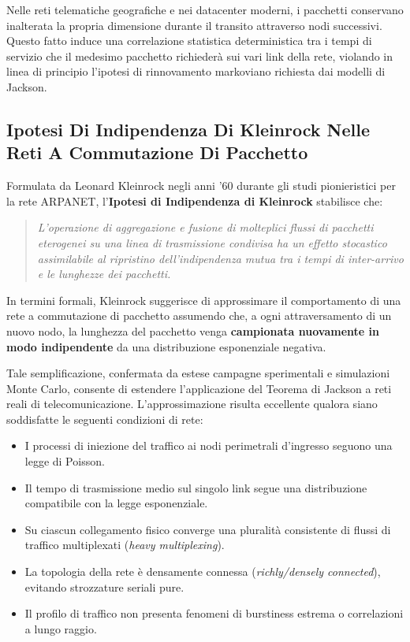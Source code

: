 \documentclass[11pt, a4paper]{article}
\begin{document}
Nelle reti telematiche geografiche e nei datacenter moderni, i pacchetti conservano inalterata la propria dimensione durante il transito attraverso nodi successivi. Questo fatto induce una correlazione statistica deterministica tra i tempi di servizio che il medesimo pacchetto richiederà sui vari link della rete, violando in linea di principio l'ipotesi di rinnovamento markoviano richiesta dai modelli di Jackson.


\subsection{Ipotesi Di Indipendenza Di Kleinrock Nelle Reti A Commutazione Di Pacchetto}

Formulata da Leonard Kleinrock negli anni '60 durante gli studi pionieristici per la rete ARPANET, l'\textbf{Ipotesi di Indipendenza di Kleinrock} stabilisce che:
\begin{quote}
\emph{L'operazione di aggregazione e fusione di molteplici flussi di pacchetti eterogenei su una linea di trasmissione condivisa ha un effetto stocastico assimilabile al ripristino dell'indipendenza mutua tra i tempi di inter-arrivo e le lunghezze dei pacchetti.}
\end{quote}
In termini formali, Kleinrock suggerisce di approssimare il comportamento di una rete a commutazione di pacchetto assumendo che, a ogni attraversamento di un nuovo nodo, la lunghezza del pacchetto venga \textbf{campionata nuovamente in modo indipendente} da una distribuzione esponenziale negativa.

Tale semplificazione, confermata da estese campagne sperimentali e simulazioni Monte Carlo, consente di estendere l'applicazione del Teorema di Jackson a reti reali di telecomunicazione. L'approssimazione risulta eccellente qualora siano soddisfatte le seguenti condizioni di rete:
\begin{itemize}[noitemsep]
    \item I processi di iniezione del traffico ai nodi perimetrali d'ingresso seguono una legge di Poisson.
    \item Il tempo di trasmissione medio sul singolo link segue una distribuzione compatibile con la legge esponenziale.
    \item Su ciascun collegamento fisico converge una pluralità consistente di flussi di traffico multiplexati (\emph{heavy multiplexing}).
    \item La topologia della rete è densamente connessa (\emph{richly/densely connected}), evitando strozzature seriali pure.
    \item Il profilo di traffico non presenta fenomeni di burstiness estrema o correlazioni a lungo raggio.
\end{itemize}
\end{document}
